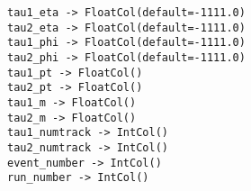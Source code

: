 \begin{footnotesize}
\begin{verbatim}
tau1_eta -> FloatCol(default=-1111.0)
tau2_eta -> FloatCol(default=-1111.0)
tau1_phi -> FloatCol(default=-1111.0)
tau2_phi -> FloatCol(default=-1111.0)
tau1_pt -> FloatCol()
tau2_pt -> FloatCol()
tau1_m -> FloatCol()
tau2_m -> FloatCol()
tau1_numtrack -> IntCol()
tau2_numtrack -> IntCol()
event_number -> IntCol()
run_number -> IntCol()
\end{verbatim}
\end{footnotesize}
